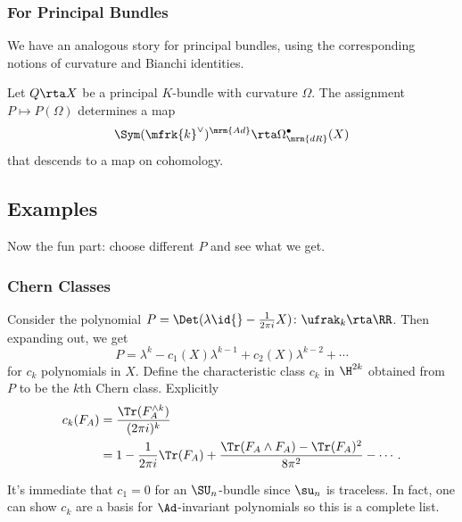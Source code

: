 \subsubsection{For Principal Bundles}

We have an analogous story for principal bundles, 
using the corresponding notions of curvature and Bianchi identities. 

\begin{prop}\label{Chern--Weil map for Principal}
	Let $Q\rta X$ be a principal $K$-bundle with curvature $\Omega$. 
	The assignment $P\mapsto P(\Omega)$ determines a map
	\[
		\Sym(\mfrk{k}^\vee)^\mrm{Ad}\rta\Omega_\mrm{dR}^\bullet(X)
	\]
	that descends to a map on cohomology. 
\end{prop}


\subsection{Examples}

Now the fun part: choose different $P$ and see what we get.


\subsubsection{Chern Classes}
\label{chern_const}

Consider the polynomial $P=\Det(\lambda\id{}-\frac{1}{2\pi i}X)\colon\ufrak_k\rta\RR$. 
Then expanding out, we get 
\[P=\lambda^k-c_1(X)\lambda^{k-1}+c_2(X)\lambda^{k-2}+\cdots\]
for $c_k$ polynomials in $X$. Define the characteristic class $c_k$ in $\H^{2k}$ obtained from $P$ to be the $k$th Chern class. Explicitly
\begin{align*}
c_k(F_A)&=\frac{\Tr(F_A^{\wedge k})}{(2\pi i)^k}\\
&=1-\frac{1}{2\pi i}\Tr(F_A)+\frac{\Tr(F_A\wedge F_A)-\Tr(F_A)^2}{8\pi^2}-\cdots.
\end{align*}
\begin{remark}
It's immediate that $c_1=0$ for an $\SU_n$-bundle since $\su_n$ is traceless. In fact, one can show $c_k$ are a basis for $\Ad$-invariant polynomials so this is a complete list.
\end{remark}

